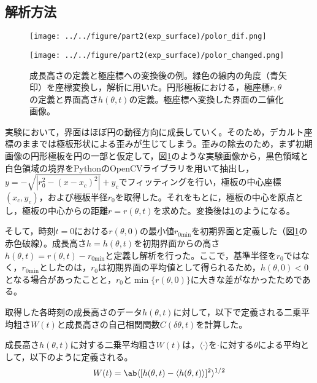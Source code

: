 \documentclass[autodetect-engine,dvi=dvipdfmx,a4paper,ja=standard,oneside,openany,11pt,draft]{bxjsbook}
\begin{document}
\subsection{解析方法}
\begin{figure}[H]
  \begin{minipage}
    {0.64\textwidth}
    \subcaption{}
    \centering
    \texttt{[image: ../../figure/part2(exp\_surface)/polor\_dif.png]}
    \label{fig:surface_hight_def}
  \end{minipage}
  \begin{minipage}
    {0.32\textwidth}
    \subcaption{}
    \centering
    \texttt{[image: ../../figure/part2(exp\_surface)/polor\_changed.png]}
    \label{fig:polor_changed}
  \end{minipage}
  \caption{成長高さの定義と極座標への変換後の例。緑色の線内の角度（青矢印）を座標変換し，解析に用いた。円形極板における，極座標$r,\theta$の定義と界面高さ$h(\theta,t)$の定義。極座標へ変換した界面の二値化画像。}
  \label{fig:surface_hight_def_polor_changed}
\end{figure}
実験において，界面はほぼ円の動径方向に成長していく。そのため，デカルト座標のままでは極板形状による歪みが生じてしまう。歪みの除去のため，まず初期画像の円形極板を円の一部と仮定して，図\ref{fig:surface_hight_def_polor_changed}のような実験画像から，黒色領域と白色領域の境界をPythonのOpenCVライブラリを用いて抽出し，$y=-\sqrt{|r_0^2-(x-x_c)^2|}+y_c$でフィッティングを行い，極板の中心座標$(x_c,y_c)$，および極板半径$r_0$を取得した。それをもとに，極板の中心を原点とし，極板の中心からの距離$r=r(\theta,t)$を求めた。変換後は\ref{fig:surface_hight_def_polor_changed}のようになる。

そして，時刻$t=0$における$r(\theta,0)$の最小値$r_{0\mathrm{min}}$を初期界面と定義した（図\ref{fig:surface_hight_def_polor_changed}の赤色破線）。成長高さ$h=h(\theta,t)$を初期界面からの高さ$h(\theta,t)=r(\theta,t)-r_{0\mathrm{min}}$と定義し解析を行った。ここで，基準半径を$r_0$ではなく，$r_{0\mathrm{min}}$としたのは，$r_0$は初期界面の平均値として得られるため，$h(\theta,0)<0$となる場合があったことと，$r_0$と$\min{\{r(\theta,0)\}}$に大きな差がなかったためである。

取得した各時刻の成長高さのデータ$h(\theta,t)$に対して，以下で定義される二乗平均粗さ$W(t)$と成長高さの自己相関関数$C(\delta\theta,t)$を計算した。

成長高さ$h(\theta,t)$に対する二乗平均粗さ$W(t)$は，$\langle\cdot\rangle$を$\cdot$に対する$\theta$による平均として，以下のように定義される。
\begin{equation}
  W(t) = \ab\langle[h(\theta,t)-\langle h(\theta,t)\rangle]^2\rangle^{1/2}
  \label{eq:W}
\end{equation}
\end{document}
